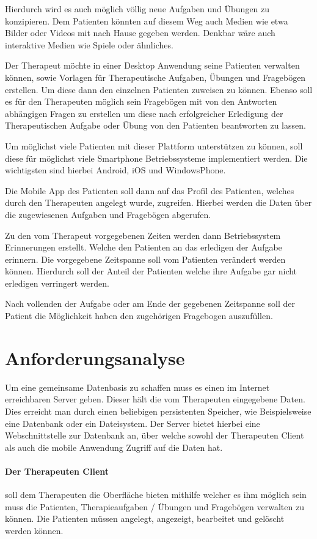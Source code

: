 Hierdurch wird es auch möglich völlig neue Aufgaben und Übungen zu konzipieren. Dem Patienten könnten auf diesem Weg auch Medien wie etwa Bilder oder Videos mit nach Hause gegeben werden. Denkbar wäre auch interaktive Medien wie Spiele oder ähnliches.

Der Therapeut möchte in einer Desktop Anwendung seine Patienten verwalten können, sowie Vorlagen für Therapeutische Aufgaben, Übungen und Fragebögen erstellen. Um diese dann den einzelnen Patienten zuweisen zu können. Ebenso soll es für den Therapeuten möglich sein Fragebögen mit von den Antworten abhängigen Fragen zu erstellen um diese nach erfolgreicher Erledigung der Therapeutischen Aufgabe oder Übung von den Patienten beantworten zu lassen.

Um möglichst viele Patienten mit dieser Plattform unterstützen zu können, soll diese für möglichst viele Smartphone Betriebssysteme implementiert werden. Die wichtigsten sind hierbei Android, iOS und WindowsPhone.

Die Mobile App des Patienten soll dann auf das Profil des Patienten, welches durch den Therapeuten angelegt wurde, zugreifen. Hierbei werden die Daten über die zugewiesenen Aufgaben und Fragebögen abgerufen.

Zu den vom Therapeut vorgegebenen Zeiten werden dann Betriebssystem Erinnerungen erstellt. Welche den Patienten an das erledigen der Aufgabe erinnern. Die vorgegebene Zeitspanne soll vom Patienten verändert werden können. Hierdurch soll der Anteil der Patienten welche ihre Aufgabe gar nicht erledigen verringert werden.

Nach vollenden der Aufgabe oder am Ende der gegebenen Zeitspanne soll der Patient die Möglichkeit haben den zugehörigen Fragebogen auszufüllen.
\section{Anforderungsanalyse}\label{Anforderungsanalyse}
Um eine gemeinsame Datenbasis zu schaffen muss es einen im Internet erreichbaren Server geben. Dieser hält die vom Therapeuten eingegebene Daten. Dies erreicht man durch einen beliebigen persistenten Speicher, wie Beispielsweise eine Datenbank oder ein Dateisystem. Der Server bietet hierbei eine Webschnittstelle zur Datenbank an, über welche sowohl der Therapeuten Client als auch die mobile Anwendung Zugriff auf die Daten hat. 

\paragraph{Der Therapeuten Client} soll dem Therapeuten die Oberfläche bieten mithilfe welcher es ihm möglich sein muss die Patienten, Therapieaufgaben / Übungen und Fragebögen verwalten zu können. Die Patienten müssen angelegt, angezeigt, bearbeitet und gelöscht werden können.

